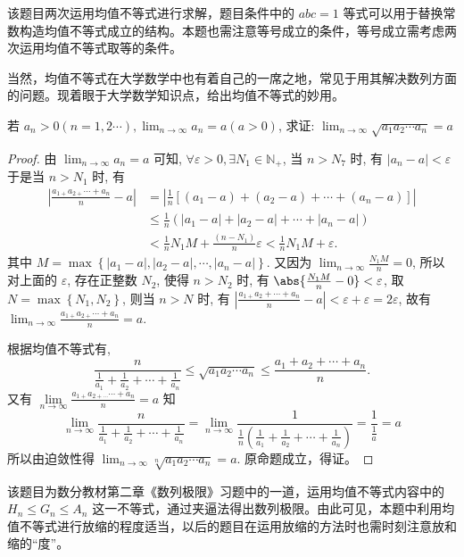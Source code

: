 \begin{analysis}
  该题目两次运用均值不等式进行求解，题目条件中的 $a b c=1$ 等式可以用于替换常数构造均值不等式成立的结构。本题也需注意等号成立的条件，等号成立需考虑两次运用均值不等式取等的条件。

  当然，均值不等式在大学数学中也有着自己的一席之地，常见于用其解决数列方面的问题。现着眼于大学数学知识点，给出均值不等式的妙用。
\end{analysis}


\begin{example}
  若 $a_{n}>0 (n=1,2 \cdots), \lim _{n \rightarrow \infty} a_{n}=a(a>0)$, 求证: $\lim _{n \rightarrow \infty} \sqrt{a_{1} a_{2} \cdots a_{n}}=a$
\end{example}

\begin{proof}
  由 $\lim _{n \rightarrow \infty} a_{n}=a$ 可知, $\forall \varepsilon>0, \exists N_{1} \in \mathbb{N}_{+}$, 当 $n>N_{7}$ 时, 有 $\left|a_{n}-a\right|<\varepsilon$ 于是当 $n>N_{1}$ 时, 有
  \begin{align*}
    \left|\frac{a_{1+} a_{2+} \cdots+a_{n}}{n}-a\right| &=\left|\frac{1}{n}\left[\left(a_{1}-a\right)+\left(a_{2}-a\right)+\cdots+\left(a_{n}-a\right)\right]\right| \\
    & \leq \frac{1}{n}\left(\left|a_{1}-a\right|+\left|a_{2}-a\right|+\cdots+\left|a_{n}-a\right|\right) \\
    &<\frac{1}{n} N_{1} M+\frac{\left(n-N_{1}\right)}{n} \varepsilon<\frac{1}{n} N_{1} M+\varepsilon.
  \end{align*}
  其中 $M=\max \left\{\left|a_{1}-a\right|,\left|a_{2}-a\right|, \cdots,\left|a_{n}-a\right|\right\}$.
  又因为 $\lim _{n \rightarrow \infty} \frac{N_{1} M}{n}=0$, 所以对上面的 $\varepsilon$, 存在正整数 $N_{2}$, 使得 $n>N_{2}$ 时, 有 $\abs{\frac{N_{1} M}{n}-0} <\varepsilon$, 取 $N=\max \left\{N_{1}, N_{2}\right\}$, 则当 $n>N$ 时, 有 $\left|\frac{a_{1+} a_{2}+\cdots+a_{n}}{n}-a\right|<\varepsilon+\varepsilon= 2 \varepsilon$, 故有 $\lim _{n \rightarrow \infty} \frac{a_{1+} a_{2+} \cdots+a_{n}}{n}=a$. 

  根据均值不等式有, 
  \[\frac{n}{\frac{1}{a_{1}}+\frac{1}{a_{2}}+\cdots+\frac{1}{a_{n}}} \leq \sqrt{a_{1} a_{2} \cdots a_{n}} \leq \frac{a_{1}+a_{2}+\cdots+a_{n}}{n}.\]
  又有 $\lim \limits_{n \rightarrow \infty} \frac{a_{1+} a_{2+\cdots} \cdots+a_{n}}{n}=a$ 知\[\lim _{n \rightarrow \infty} \frac{n}{\frac{1}{a_{1}}+\frac{1}{a_{2}}+\cdots+\frac{1}{a_{n}}}=\lim _{n \rightarrow \infty} \frac{1}{\frac{1}{n}\left(\frac{1}{a_{1}}+\frac{1}{a_{2}}+\cdots+\frac{1}{a_{n}}\right)}=\frac{1}{\frac{1}{a}}=a\]
  所以由迫敛性得 $\lim _{n \rightarrow \infty} \sqrt[n]{a_{1} a_{2} \cdots a_{n}}=a$. 
  原命题成立，得证。
\end{proof}

\begin{analysis}
  该题目为数分教材第二章《数列极限》习题中的一道，运用均值不等式内容中的 $H_{n} \leq G_{n} \leq A_{n}$ 这一不等式，通过夹逼法得出数列极限。由此可见，本题中利用均值不等式进行放缩的程度适当，以后的题目在运用放缩的方法时也需时刻注意放和缩的“度”。
\end{analysis}